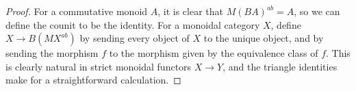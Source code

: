 \documentclass{amsbook} %
\numberwithin{section}{chapter}
\begin{document}
\begin{proof}
For a commutative monoid $A$, it is clear that $M(BA)^{ab} = A$, so we can define the counit to be the identity. For a monoidal category $X$, define $X \to B(MX^{ab})$ by sending every object of $X$ to the unique object, and by sending the morphism $f$ to the morphism given by the equivalence class of $f$. This is clearly natural in strict monoidal functors $X \to Y$, and the triangle identities make for a straightforward calculation.




\end{proof}
\end{document}
